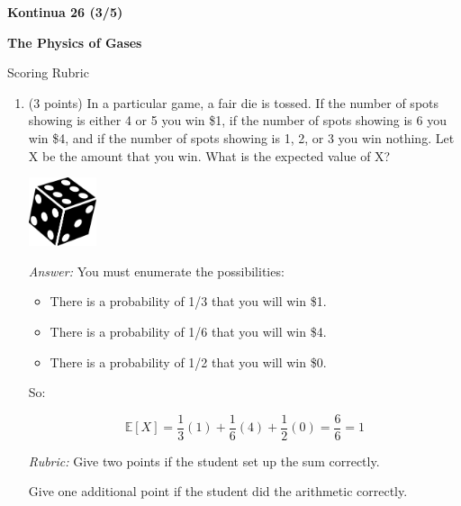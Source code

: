 \documentclass[letterpaper,12pt,addpoints]{exam}
\begin{document}
{\selectfont

\textbf{Kontinua 26 (3/5)}

\Large \textbf{The Physics of Gases}

\vspace{2mm}

Scoring Rubric
} 
\parbox{0.35\textwidth}{

} %


\begin{enumerate}

\item (3 points) In a particular game, a fair die is tossed.  If the number of spots showing is either 4 or 5 you win \$1, if the number of spots showing is 6 you win \$4, and if the number of spots showing is 1, 2, or 3 you win nothing.  Let X be the amount that you win. 
What is the expected value of X?

\vspace{0.2cm}
\begin{center}
\includegraphics[width=2cm]{dice_simple.png}
\end{center}

\begin{minipage}[t]{0.50\textwidth}
\textit{Answer:} You must enumerate the possibilities:
\begin{itemize}
\item There is a probability of 1/3 that you will win \$1.  
\item There is a probability of 1/6 that you will win \$4.
\item There is a probability of 1/2 that you will win \$0.
\end{itemize}

So:

$$\mathbb{E}[X] = \frac{1}{3}(1) + \frac{1}{6}(4) +  \frac{1}{2}(0) = \frac{6}{6} = 1 $$

\end{minipage}
\hspace{0.05\textwidth}
\begin{minipage}[t]{0.40\textwidth}

\textit{Rubric:} Give two points if the student set up the sum correctly.  

Give one additional point if the student did the arithmetic correctly. 
\end{minipage}


\end{enumerate}
\end{document}

